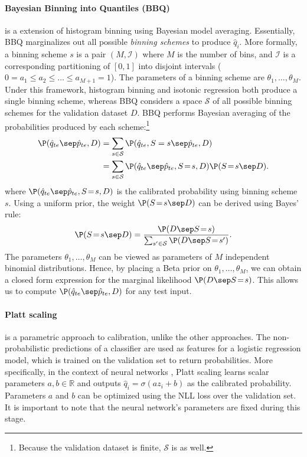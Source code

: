\paragraph{Bayesian Binning into Quantiles (BBQ)} \cite{naeini2015obtaining} is a extension of histogram binning using Bayesian model averaging. Essentially, BBQ marginalizes out all possible \emph{binning schemes} to produce $\hat q_i$.
More formally, a binning scheme $s$ is a pair $(M,\mathcal{I})$ where $M$ is the number of bins, and $\mathcal{I}$ is a corresponding partitioning of $[0,1]$ into disjoint intervals ($0 = a_1 \leq a_2 \leq \ldots \leq a_{M+1} = 1$). The parameters of a binning scheme are $\theta_1,\ldots,\theta_M$. Under this framework, histogram binning and isotonic regression both produce a single binning scheme, whereas BBQ considers a space $\mathcal{S}$ of all possible binning schemes for the validation dataset $D$. BBQ performs Bayesian averaging of the probabilities produced by each scheme:\footnote{
  Because the validation dataset is finite, $\mathcal{S}$ is as well.
}
%
%
\begin{align*}
\P(\hat q_{te} \sep \hat p_{te}, D) &= \sum_{s \in \mathcal{S}} \P(\hat q_{te}, S=s \sep \hat p_{te}, D) \\
  &= \sum_{s \in \mathcal{S}} \P(\hat q_{te} \sep \hat p_{te}, S\!=\!s, D) \P(S\!=\!s \sep D).
\end{align*}
where $\P(\hat q_{te} \sep \hat p_{te}, S\!=\!s, D)$ is the calibrated probability using binning scheme $s$. Using a uniform prior, the weight $\P(S\!=\!s \sep D)$ can be derived using Bayes' rule:
%
$$\P(S\!=\!s \sep D) = \frac{\P(D \sep S\!=\!s)}{\sum_{s' \in \mathcal{S}} \P(D \sep S\!=\!s')}.$$
%
The parameters $\theta_1,\ldots,\theta_M$ can be viewed as parameters of $M$ independent binomial distributions. Hence, by placing a Beta prior on $\theta_1, \ldots, \theta_M$, we can obtain a closed form expression for the marginal likelihood $\P(D \sep S\!=\!s)$. This allows us to compute $\P(\hat q_{te} \sep \hat p_{te}, D)$ for any test input.


\paragraph{Platt scaling} \cite{platt1999probabilistic} is a parametric approach to calibration, unlike the other approaches. The non-probabilistic predictions of a classifier are used as features for a logistic regression model, which is trained on the validation set to return probabilities. More specifically, in the context of neural networks \cite{niculescu2005predicting}, Platt scaling learns scalar parameters $a,b \in \mathbb{R}$ and outputs $\hat q_i = \sigma(a z_i +b)$ as the calibrated probability. Parameters $a$ and $b$ can be optimized using the NLL loss over the validation set. It is important to note that the neural network's parameters are fixed during this stage.

